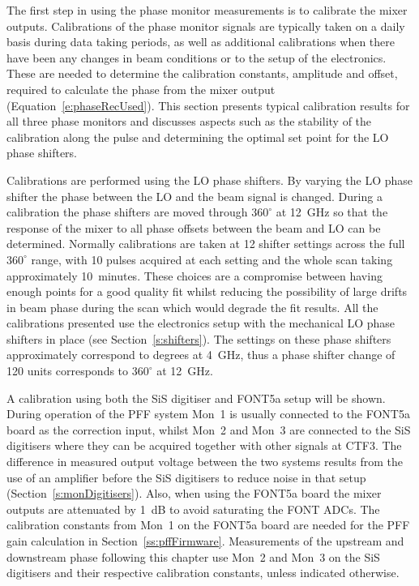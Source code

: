 
The first step in using the phase monitor measurements is to calibrate the mixer outputs. Calibrations of the phase monitor signals are typically taken on a daily basis during data taking periods, as well as additional calibrations when there have been any changes in beam conditions or to the setup of the electronics. These are needed to determine the calibration constants, amplitude and offset, required to calculate the phase from the mixer output (Equation~\ref{e:phaseRecUsed}). This section presents typical calibration results for all three phase monitors and discusses aspects such as the stability of the calibration along the pulse and determining the optimal set point for the LO phase shifters. 

Calibrations are performed using the LO phase shifters. By varying the LO phase shifter the phase between the LO and the beam signal is changed. During a calibration the phase shifters are moved through \(360^\circ\) at 12~GHz  so that the response of the mixer to all phase offsets between the beam and LO can be determined. Normally calibrations are taken at 12 shifter settings across the full \(360^\circ\) range, with 10 pulses acquired at each setting and the whole scan taking approximately 10~minutes. These choices are a compromise between having enough points for a good quality fit whilst reducing the possibility of large drifts in beam phase during the scan which would degrade the fit results. All the calibrations presented use the electronics setup with the mechanical LO phase shifters in place (see Section~\ref{s:shifters}). The settings on these phase shifters approximately correspond to degrees at 4~GHz, thus a phase shifter change of 120 units corresponds to \(360^\circ\) at 12~GHz.

A calibration using both the SiS digitiser and FONT5a setup will be shown. During operation of the PFF system Mon~1 is usually connected to the FONT5a board as the correction input, whilst Mon~2 and Mon~3 are connected to the SiS digitisers where they can be acquired together with other signals at CTF3. The difference in measured output voltage between the two systems results from the use of an amplifier before the SiS digitisers to reduce noise in that setup (Section~\ref{s:monDigitisers}). Also, when using the FONT5a board the mixer outputs are attenuated by 1~dB to avoid saturating the FONT ADCs. The calibration constants from Mon~1 on the FONT5a board are needed for the PFF gain calculation in Section~\ref{ss:pffFirmware}. Measurements of the upstream and downstream phase following this chapter use Mon~2 and Mon~3 on the SiS digitisers and their respective calibration constants, unless indicated otherwise.

